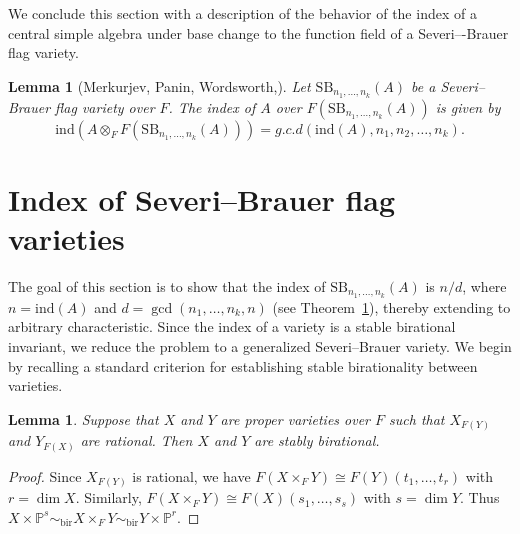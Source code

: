 \documentclass[10pt]{amsart}
\theoremstyle{plain}
\newtheorem{lemma}[thm]{Lemma}
\theoremstyle{definition}
\begin{document}
 We conclude this section with a description of the behavior of the index of a central simple algebra under base change to the function field of a Severi–-Brauer flag variety.
\begin{lemma}[Merkurjev, Panin, Wordsworth,{\cite[Equation 5.11]{MPW}}]\label{index after base change}
    Let \(\mathrm{SB}_{n_1,\ldots,n_k}(A)\) be a Severi--Brauer flag variety over \(F\). The index of \(A\) over \(F(\mathrm{SB}_{n_1,\ldots,n_k}(A))\) is given by 
    \[\mathrm{ind}(A \otimes_F F(\mathrm{SB}_{n_1,\ldots,n_k}(A))) = g.c.d(\mathrm{ind}(A),n_1,n_2,\dots,n_k).\]
\end{lemma}

\section{Index of Severi--Brauer flag varieties}\label{index of SB flag variety}
The goal of this section is to show that the index of \(\mathrm{SB}_{n_1,\ldots,n_k}(A)\) is \(n/d\), where \(n=\mathrm{ind}(A)\) and \(d=\gcd(n_1,\ldots,n_k,n)\) (see Theorem~\ref{index of SB flag variety}), thereby extending \cite[Lemma~7.1]{zerocycle} to arbitrary characteristic. Since the index of a variety is a stable birational invariant, we reduce the problem to a generalized Severi--Brauer variety. We begin by recalling a standard criterion for establishing stable birationality between varieties. 

\begin{lemma}\label{stable birationality}
Suppose that \(X\) and \(Y\) are proper varieties over \(F\) such that \(X_{F(Y)}\) and \(Y_{F(X)}\) are rational. Then \(X\) and \(Y\) are stably birational.
\end{lemma}
\begin{proof}
Since \(X_{F(Y)}\) is rational, we have \(F(X \times_F Y) \cong F(Y)(t_1,\dots,t_r)\) with \(r=\dim X\). Similarly, \(F(X \times_F Y) \cong F(X)(s_1,\dots,s_s)\) with \(s=\dim Y\). Thus
\(X \times \mathbb{P}^s \sim_{\mathrm{bir}} X \times_F Y \sim_{\mathrm{bir}} Y \times \mathbb{P}^r\).
\end{proof}
\end{document}
